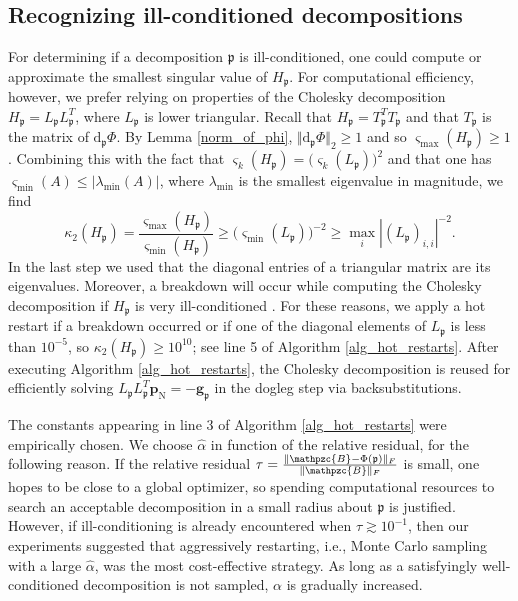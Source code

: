 \documentclass[a4paper,10pt,final]{siamart1116}
\newcommand{\tuple}[1]{\mathfrak{#1}}
\newcommand{\tensor}[1]{\mathpzc{#1}}
\newcommand{\vect}[1]{\mathbf{#1}}
\newcommand{\deriv}[2]{\mathrm{d}_{#1}#2}
\newcommand{\refalg}[1]{Algorithm \ref{#1}}
\numberwithin{equation}{section}
\numberwithin{figure}{section}
\numberwithin{table}{section}
\numberwithin{theorem}{section}
\begin{document}
\subsection{Recognizing ill-conditioned decompositions}
For determining if a decomposition $\tuple{p}$ is ill-conditioned, one could compute or approximate the smallest singular value of $H_{\tuple{p}}$.
For computational efficiency, however, we prefer relying on properties of the Cholesky decomposition $H_{\tuple{p}} = L_{\tuple{p}} L_{\tuple{p}}^T$, where $L_{\tuple{p}}$ is lower triangular. Recall that $H_{\tuple{p}}=T_{\tuple{p}}^T T_{\tuple{p}}$ and that $T_{\tuple{p}}$ is the matrix of $\deriv{\tuple{p}}{\Phi}$.
By Lemma \ref{norm_of_phi}, $\Vert \deriv{\tuple{p}}{\Phi}\Vert_2\geq 1$ and so $\varsigma_{\max}(H_{\tuple{p}}) \ge 1$. Combining this with the fact that $\varsigma_k(H_{\tuple{p}}) = \bigl( \varsigma_k(L_{\tuple{p}}) \bigr)^2$ and that one has $\varsigma_{\min}(A) \le |\lambda_{\min}(A)|$, where $\lambda_{\min}$ is the smallest eigenvalue in magnitude, we find
$$
\kappa_2( H_{\tuple{p}} ) = \frac{\varsigma_{\max}( H_{\tuple{p}} )}{\varsigma_{\min}( H_{\tuple{p}} )} \ge \bigl( \varsigma_{\min}(L_{\tuple{p}}) \bigr)^{-2}
\ge \max_i |(L_{\tuple{p}})_{i,i}|^{-2}.
$$
In the last step we used that the diagonal entries of a triangular matrix are its eigenvalues.
Moreover, a breakdown will occur while computing the Cholesky decomposition if $H_{\tuple{p}}$ is very ill-conditioned \cite[p. 200]{Higham1996}.
For these reasons, we apply a hot restart if a breakdown occurred or if one of the diagonal elements of $L_{\tuple{p}}$ is less than $10^{-5}$, so $\kappa_2(H_{\tuple{p}}) \ge 10^{10}$; see line {5} of \refalg{alg_hot_restarts}.
After executing \refalg{alg_hot_restarts}, the Cholesky decomposition is reused for efficiently solving $L_{\tuple{p}} L_{\tuple{p}}^{T} \vect{p}_{\mathrm{N}} = - \vect{g}_{\tuple{p}}$ in the dogleg step via backsubstitutions.

The constants appearing in line $3$ of \refalg{alg_hot_restarts} were empirically chosen.
We choose $\widehat{\alpha}$ in function of the relative residual, for the following reason. If the relative residual $\tau = \tfrac{\|\tensor{B}-\Phi(\tuple{p})\|_F}{\|\tensor{B}\|_F}$ is small, one hopes to be close to a global optimizer, so spending computational resources to search an acceptable decomposition in a small radius about $\tuple{p}$ is justified. However, if ill-conditioning is already encountered when $\tau \gtrsim 10^{-1}$, then our experiments suggested that aggressively restarting, {i.e., Monte Carlo sampling with a large $\widehat{\alpha}$,} was the most cost-effective strategy.
As long as a satisfyingly well-conditioned decomposition is not sampled, $\alpha$ is gradually increased.
\end{document}
